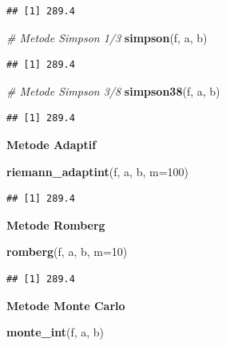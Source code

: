 \documentclass[]{book}
\newenvironment{Shaded}{\begin{snugshade}}{\end{snugshade}}
\newcommand{\CommentTok}[1]{\textcolor[rgb]{0.56,0.35,0.01}{\textit{#1}}}
\newcommand{\DataTypeTok}[1]{\textcolor[rgb]{0.13,0.29,0.53}{#1}}
\newcommand{\DecValTok}[1]{\textcolor[rgb]{0.00,0.00,0.81}{#1}}
\newcommand{\KeywordTok}[1]{\textcolor[rgb]{0.13,0.29,0.53}{\textbf{#1}}}
\newcommand{\NormalTok}[1]{#1}
\theoremstyle{definition}
\theoremstyle{definition}
\theoremstyle{definition}
\theoremstyle{remark}
\begin{document}
\begin{verbatim}
## [1] 289.4
\end{verbatim}

\begin{Shaded}
\begin{Highlighting}[]
\CommentTok{# Metode Simpson 1/3}
\KeywordTok{simpson}\NormalTok{(f, a, b)}
\end{Highlighting}
\end{Shaded}

\begin{verbatim}
## [1] 289.4
\end{verbatim}

\begin{Shaded}
\begin{Highlighting}[]
\CommentTok{# Metode Simpson 3/8}
\KeywordTok{simpson38}\NormalTok{(f, a, b)}
\end{Highlighting}
\end{Shaded}

\begin{verbatim}
## [1] 289.4
\end{verbatim}

\textbf{Metode Adaptif}

\begin{Shaded}
\begin{Highlighting}[]
\KeywordTok{riemann_adaptint}\NormalTok{(f, a, b, }\DataTypeTok{m=}\DecValTok{100}\NormalTok{)}
\end{Highlighting}
\end{Shaded}

\begin{verbatim}
## [1] 289.4
\end{verbatim}

\textbf{Metode Romberg}

\begin{Shaded}
\begin{Highlighting}[]
\KeywordTok{romberg}\NormalTok{(f, a, b, }\DataTypeTok{m=}\DecValTok{10}\NormalTok{)}
\end{Highlighting}
\end{Shaded}

\begin{verbatim}
## [1] 289.4
\end{verbatim}

\textbf{Metode Monte Carlo}

\begin{Shaded}
\begin{Highlighting}[]
\KeywordTok{monte_int}\NormalTok{(f, a, b)}
\end{Highlighting}
\end{Shaded}
\end{document}
